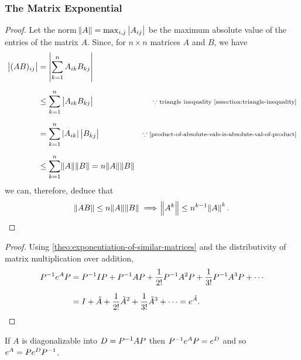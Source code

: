 \documentclass[../MathsNotesBase.tex]{subfiles}
\begin{document}
{	
	\biggerskip
	\subsubsection{The Matrix Exponential}
	\bigskip

	\bigskip
	\begin{proof}
		Let the norm ${ \norm{A} = \max_{i,j}{\left\lvert A_{ij}\right\rvert} }$ be the maximum absolute value of the entries of the matrix $A$. Since, for ${ n \times n }$ matrices $A$ and $B$, we have
		\[\begin{aligned}
			\abs{ (AB)_{ij} } &= \abs{ \sum_{k=1}^n A_{ik}B_{kj} } \nn
			&\leq \sum_{k=1}^n \abs{A_{ik} B_{kj}} &\sidecomment{$\because$ triangle inequality \ref{sssection:triangle-inequality}}\nn
			&= \sum_{k=1}^n \abs{A_{ik}} \abs{B_{kj}} &\sidecomment{$\because$ \autoref{product-of-absolute-vals-is-absolute-val-of-product}}\nn
			&\leq \sum_{k=1}^n \norm{A}\norm{B} = n \norm{A}\norm{B}
		\end{aligned}\]
		we can, therefore, deduce that
		\[ \norm{AB} \leq n\norm{A}\norm{B} \implies \norm{A^k} \leq n^{k-1} \norm{A}^k. \]
		
	\end{proof}
		
	\bigskip
	\begin{tcolorbox}[breakable,enhanced jigsaw,colframe=white,colback=white,boxrule=0pt,arc=0pt,left=0pt,right=0pt,top=0pt,bottom=0pt]
		\begin{proof}
			Using \autoref{theo:exponentiation-of-similar-matrices} and the distributivity of matrix multiplication over addition,
			\[\begin{aligned}
				\inv{P} e^A P &= \inv{P} I P + \inv{P} A P + \frac{1}{2!}\inv{P} A^2 P + \frac{1}{3!}\inv{P} A^3 P + \cdots \nn
				&= I + \tilde{A} + \frac{1}{2!}\tilde{A}^2 + \frac{1}{3!}\tilde{A}^3 + \cdots = e^{\tilde{A}}. \qedhere \\
			\end{aligned}\]
		\end{proof}
	\end{tcolorbox}
	\begin{corollary}
		If $A$ is diagonalizable into ${ D = {P}^{-1} A P }$ then ${ {P}^{-1} e^A P = e^D }$ and so ${ e^A = P e^D {P}^{-1} }$.
	\end{corollary}

}
\end{document}
